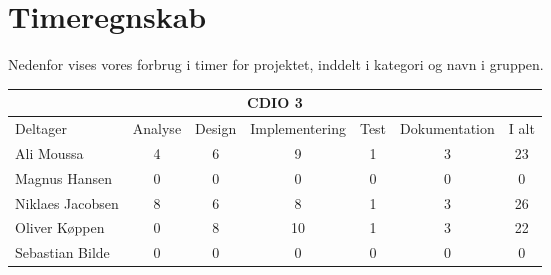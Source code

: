 \chapter{Timeregnskab}

Nedenfor vises vores forbrug i timer for projektet, inddelt i kategori og navn i gruppen.

\begin{table}[h]
    \centering
        \begin{tabular}{|l|c|c|c|c|c|c|}
                \hline
            \multicolumn{7}{|c|}{CDIO 3}
            \\ \hline
                    Deltager         &  Analyse  &  Design  &  Implementering  &  Test  &  Dokumentation  &  I alt
            \\ \hline
                    Ali Moussa       &    4      &    6     &        9         &    1   &        3        &    23
            \\ \hline
                    Magnus Hansen    &    0      &    0     &        0         &    0   &        0        &    0
            \\ \hline
                    Niklaes Jacobsen &    8      &    6     &        8         &    1   &        3        &    26
            \\ \hline
                    Oliver Køppen    &    0      &    8     &        10        &    1   &        3        &    22
            \\ \hline
                    Sebastian Bilde  &    0      &    0     &        0         &    0   &        0        &    0
            \\ \hline
        \end{tabular}
\end{table}
